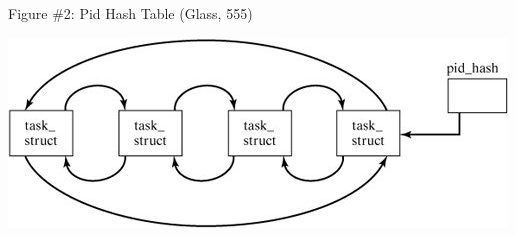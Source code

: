 \documentclass[12pt]{extarticle}
\newenvironment{myindentpar}[1]%
 {\begin{list}{}%
         {\setlength{\leftmargin}{#1}}%
         \item[]%
 }
 {\end{list}}
\begin{document}
\begin{myindentpar}{5mm}
    \vspace{10mm}
    \begin{center}
        Figure \#2: Pid Hash Table (Glass, 555)
    \end{center}
    \begin{center}
        \includegraphics{pid_hash.png}
    \end{center}


\end{myindentpar}
\end{document}
